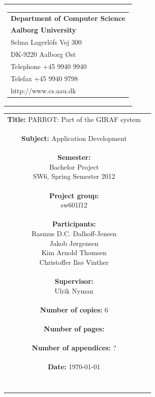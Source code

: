 \begin{nopagebreak}
\samepage 
\begin{tabular}{r}
\parbox{\textwidth}{
\hfill \parbox{6.2cm}{\begin{tabular}{l}
{\textsf\small \textbf{Department of Computer Science }}\\
{\textsf\small  \textbf{Aalborg University}}\\
{\textsf\small Selma Lagerlöfs Vej 300}\\
{\textsf\small DK-9220 Aalborg Øst}\\
{\textsf\small Telephone +45 9940 9940}\\
{\textsf\small Telefax +45 9940 9798}\\
{\textsf\small http://www.cs.aau.dk}
\end{tabular}}}
\end{tabular}

\begin{tabular}{cc}
\parbox{7cm}{
\textbf{Title:} 
PARROT: Part of the GIRAF system\\ \\
\textbf{Subject:} 
Application Development \\ \\
\textbf{Semester:} \\
Bachelor Project \\
SW6, Spring Semester 2012\\ \\
\textbf{Project group:} \\
sw601f12\\ \\
\textbf{Participants:} \\
Rasmus D.C. Dalhoff-Jensen \\
Jakob J\o{}rgensen \\
Kim Arnold Thomsen \\
Christoffer Ils\o{} Vinther\\ \\
\textbf{Supervisor:} \\
Ulrik Nyman\\ \\
\textbf{Number of copies:}
6 \\ \\
\textbf{Number of pages:}
 \\ \\
\textbf{Number of appendices:}
? \\ \\
\textbf{Date:}
\today \\ \\ \\
}


\end{tabular}
\end{nopagebreak}
